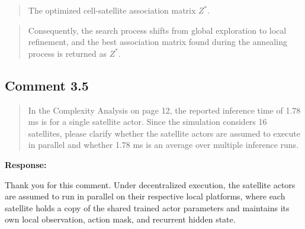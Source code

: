 \documentclass[11pt,a4paper]{article}
\begin{document}

\begin{quote}\small\color{revisionblue}
The optimized cell-satellite association matrix $Z^*$.
\par
\end{quote}


\begin{quote}\small\color{revisionblue}
Consequently, the search process shifts from global exploration to local refinement, and the best association matrix found during the annealing process is returned as $Z^*$.
\par
\end{quote}


\subsection*{Comment 3.5}

\begin{quote}\small In the Complexity Analysis on page 12, the reported inference time of 1.78 ms is for a single satellite actor. Since the simulation considers 16 satellites, please clarify whether the satellite actors are assumed to execute in parallel and whether 1.78 ms is an average over multiple inference runs.\end{quote}

\textbf{Response:}\par

Thank you for this comment. Under decentralized execution, the satellite actors are assumed to run in parallel on their respective local platforms, where each satellite holds a copy of the shared trained actor parameters and maintains its own local observation, action mask, and recurrent hidden state.
\par
\end{document}
